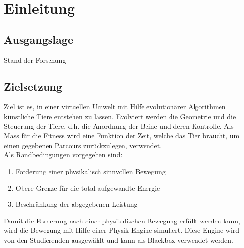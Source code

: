%
%


\chapter{Einleitung}
\lipsum[33-37]
\section{Ausgangslage}
\lipsum[5-9]
Stand der Forschung 
\section{Zielsetzung}
Ziel ist es, in einer virtuellen Umwelt mit Hilfe evolutionärer Algorithmen künstliche Tiere entstehen zu lassen.
Evolviert werden die Geometrie und die Steuerung der Tiere, d.h. die Anordnung der Beine und deren Kontrolle.
Als Mass für die Fitness wird eine Funktion der Zeit, welche das Tier braucht,
um einen gegebenen Parcours zurückzulegen, verwendet.\\
Als Randbedingungen vorgegeben sind:
\begin{enumerate}
  \item Forderung einer physikalisch sinnvollen Bewegung
  \item Obere Grenze für die total aufgewandte Energie
  \item Beschränkung der abgegebenen Leistung
\end{enumerate}
Damit die Forderung nach einer physikalischen Bewegung erfüllt werden kann,
wird die Bewegung mit Hilfe einer Physik-Engine simuliert.
Diese Engine wird von den Studierenden ausgewählt und kann als Blackbox verwendet werden.
